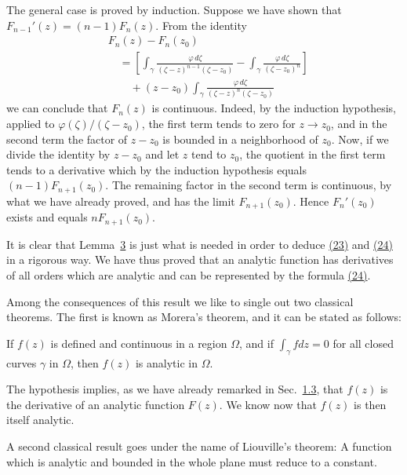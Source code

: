 The general case is proved by induction. Suppose we have shown that $F_{n-1}'(z) = (n - 1)F_n(z)$. From the identity
\begin{equation*}
\begin{aligned}
&F_n(z)-F_n(z_0)\\
&\quad=\left[\int_\gamma\frac{\varphi\,d\zeta}{(\zeta-z)^{n-1}(\zeta-z_0)}
-\int_\gamma\frac{\varphi\,d\zeta}{(\zeta-z_0)^n}\right]\\
&\qquad+(z-z_0)\int_\gamma\frac{\varphi\,d\zeta}{(\zeta-z)^n(\zeta-z_0)}
\end{aligned}
\end{equation*}
we can conclude that $F_{n}(z)$ is continuous. Indeed, by the induction hypothesis, applied to $\varphi(\zeta)/(\zeta - z_{0})$, the first term tends to zero for $z \to z_{0}$, and in the second term the factor of $z - z_{0}$ is bounded in a neighborhood of $z_{0}$. Now, if we divide the identity by $z - z_{0}$ and let $z$ tend to $z_{0}$, the quotient in the first term tends to a derivative which by the induction hypothesis equals $(n - 1)F_{n+1}(z_{0})$. The remaining factor in the second term is continuous, by what we have already proved, and has the limit $F_{n+1}(z_{0})$. Hence $F_{n}'(z_{0})$ exists and equals $nF_{n+1}(z_{0})$.

It is clear that Lemma~\hyperref[lem:4.3]{3} is just what is needed in order to deduce \hyperref[eq:4.23]{(23)} and \hyperref[eq:4.24]{(24)} in a rigorous way. We have thus proved that an analytic function has derivatives of all orders which are analytic and can be represented by the formula \hyperref[eq:4.24]{(24)}.

Among the consequences of this result we like to single out two classical theorems. The first is known as Morera's theorem, and it can be stated as follows:

If $f(z)$ is defined and continuous in a region $\Omega$, and if $\int_{\gamma} f dz = 0$ for all closed curves $\gamma$ in $\Omega$, then $f(z)$ is analytic in $\Omega$.

The hypothesis implies, as we have already remarked in Sec.~\hyperref[sec:4.1.3]{1.3}, that $f(z)$ is the derivative of an analytic function $F(z)$. We know now that $f(z)$ is then itself analytic.

A second classical result goes under the name of Liouville's theorem: A function which is analytic and bounded in the whole plane must reduce to a constant.

